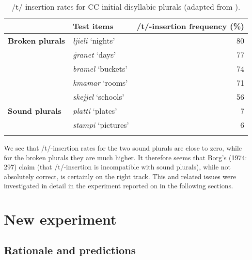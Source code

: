 \documentclass[output=paper]{langsci/langscibook}
\begin{document}
\begin{table}
\begin{tabularx}{\textwidth}{XQr} 
\lsptoprule
& \textbf{Test items} & \textbf{/t/-insertion frequency (\%)}\\
\midrule 
\textbf{Broken plurals}
& \textit{ljieli}    ‘nights’ & 80\\
& \textit{\.granet}    ‘days’ & 77\\
& \textit{bramel}    ‘buckets’ & 74\\
& \textit{kmamar}  ‘rooms’ & 71\\
& \textit{skejjel}    ‘schools’ & 56\\
\tablevspace
\textbf{Sound plurals}  
& \textit{platti}    ‘plates’ & 7\\
& \textit{stampi}    ‘pictures’ & 6\\ 
\lspbottomrule
\end{tabularx}
\caption{
/t/-insertion rates for CC-initial {disyllabic} plurals (adapted from \citealt{LucasSpagnol2016}).
}

\label{tab:lucas:2}
\end{table}


We see that /t/-insertion rates for the two sound plurals are close to zero, while for the broken plurals they are much higher. It therefore seems that Borg’s (1974: 297) claim (that /t/-insertion is incompatible with sound plurals), while not absolutely correct, is certainly on the right track. This and related issues were investigated in detail in the experiment reported on in the following sections.

\largerpage[-1]
\section{New experiment}
\subsection{Rationale and predictions}\label{sec:lucas:‎2.1}
\end{document}
